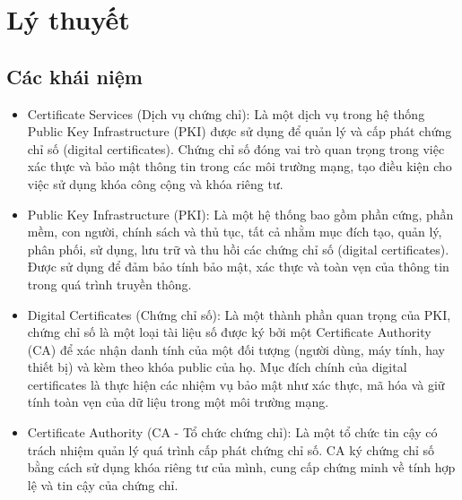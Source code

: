\documentclass[13pt]{report}
\begin{document}
	\chapter{Lý thuyết}
	\section{Các khái niệm}
	\begin{itemize}
		\item Certificate Services (Dịch vụ chứng chỉ): Là một dịch vụ trong hệ thống Public Key Infrastructure (PKI) được sử dụng để quản lý và cấp phát chứng chỉ số (digital certificates). Chứng chỉ số đóng vai trò quan trọng trong việc xác thực và bảo mật thông tin trong các môi trường mạng, tạo điều kiện cho việc sử dụng khóa công cộng và khóa riêng tư.
		\item Public Key Infrastructure (PKI): Là một hệ thống bao gồm phần cứng, phần mềm, con người, chính sách và thủ tục, tất cả nhằm mục đích tạo, quản lý, phân phối, sử dụng, lưu trữ và thu hồi các chứng chỉ số (digital certificates). Được sử dụng để đảm bảo tính bảo mật, xác thực và toàn vẹn của thông tin trong quá trình truyền thông.
		\item Digital Certificates (Chứng chỉ số):  Là một thành phần quan trọng của PKI, chứng chỉ số là một loại tài liệu số được ký bởi một Certificate Authority (CA) để xác nhận danh tính của một đối tượng (người dùng, máy tính, hay thiết bị) và kèm theo khóa public của họ. Mục đích chính của digital certificates là thực hiện các nhiệm vụ bảo mật như xác thực, mã hóa và giữ tính toàn vẹn của dữ liệu trong một môi trường mạng.
		\item Certificate Authority (CA - Tổ chức chứng chỉ): Là một tổ chức tin cậy có trách nhiệm quản lý quá trình cấp phát chứng chỉ số. CA ký chứng chỉ số bằng cách sử dụng khóa riêng tư của mình, cung cấp chứng minh về tính hợp lệ và tin cậy của chứng chỉ.
	\end{itemize}
\end{document}
